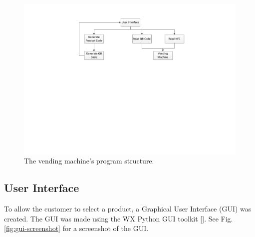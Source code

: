 \begin{figure}
 \centering 
 \includegraphics[clip=true, trim = 120 370 0 50,
 scale=0.7]{vending_machine_program_structure}
 \caption{The vending machine's program structure.}
 \label{fig:vm_prog_strcture}
\end{figure}

\subsection{User Interface}

To allow the customer to select a product, a Graphical User Interface (GUI) was
created. The GUI was made using the WX Python GUI toolkit
[\cite{website:wx-python}].
See Fig. \ref{fig:gui-screenshot} for a screenshot of the
GUI.

